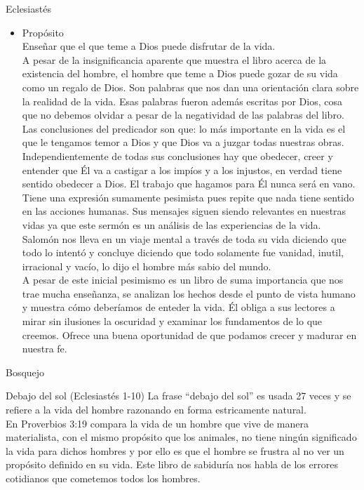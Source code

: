\begin{section}{Eclesiastés}
\begin{itemize}
		\item Propósito\\
			Enseñar que el que teme a Dios puede disfrutar de la vida.\\
			A pesar de la insignificancia aparente que muestra el libro acerca de la existencia del hombre, el hombre que teme a Dios puede gozar de su vida como un regalo de Dios. Son palabras que nos dan una orientación clara sobre la realidad de la vida. Esas palabras fueron además escritas por Dios, cosa que no debemos olvidar a pesar de la negatividad de las palabras del libro.\\
			Las conclusiones del predicador son que: lo más importante en la vida es el que le tengamos temor a Dios y que Dios va a juzgar todas nuestras obras. Independientemente de todas sus conclusiones hay que obedecer, creer y entender que Él va a castigar a los impíos y a los injustos, en verdad tiene sentido obedecer a Dios. El trabajo que hagamos para Él nunca será en vano. Tiene una expresión sumamente pesimista pues repite que nada tiene sentido en las acciones humanas.
			\newpage
			Sus mensajes siguen siendo relevantes en nuestras vidas ya que este sermón es un análisis de las experiencias de la vida. Salomón nos lleva en un viaje mental a través de toda su vida diciendo que todo lo intentó y concluye diciendo que todo solamente fue vanidad, inutil, irracional y vacío, lo dijo el hombre más sabio del mundo.\\
			A pesar de este inicial pesimismo es un libro de suma importancia que nos trae mucha enseñanza, se analizan los hechos desde el punto de vista humano y muestra cómo deberíamos de enteder la vida. Él obliga a sus lectores a mirar sin ilusiones la oscuridad y examinar los fundamentos de lo que creemos. Ofrece una buena oportunidad de que podamos crecer y madurar en nuestra fe.
	\end{itemize}
	\begin{subsection}{Bosquejo}
		\begin{subsubsection}{Debajo del sol (Eclesiastés 1-10)}
			La frase ``debajo del sol'' es usada 27 veces y se refiere a la vida del hombre razonando en forma estricamente natural.\\
			 En Proverbios 3:19 compara la vida de un hombre que vive de manera materialista, con el mismo propósito que los animales, no tiene ningún significado la vida para dichos hombres y por ello es que el hombre se frustra al no ver un propósito definido en su vida. Este libro de sabiduría nos habla de los errores cotidianos que cometemos todos los hombres.\\

\end{subsubsection}
\end{subsection}
\end{section}
